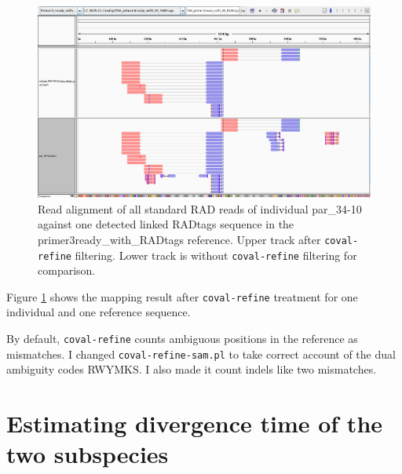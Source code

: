 \documentclass[a4paper,12pt,times,print,index, custombib]{PhDThesisPSnPDF}\usepackage[]{graphicx}\usepackage[]{color}
\begin{document}
\begin{figure}
\centering
\includegraphics[width=\textwidth]{stampy_par_34-10_vs_primer3ready_after_coval-refine_igv}
\caption{Read alignment of all standard RAD reads of individual par\_34-10 against one detected linked RADtags sequence in the primer3ready\_with\_RADtags reference. Upper track after \texttt{coval-refine} filtering. Lower track is without \texttt{coval-refine} filtering for comparison.}
\label{coval-refine}
\end{figure}

Figure \ref{coval-refine} shows the mapping result after \texttt{coval-refine} treatment for one individual and one reference sequence.

By default, \texttt{coval-refine} counts ambiguous positions in the reference as mismatches. I changed \texttt{coval-refine-sam.pl} to take correct account of the dual ambiguity codes RWYMKS. I also made it count \glspl{indel} like two mismatches.

\section{Estimating divergence time of the two subspecies}
\end{document}
